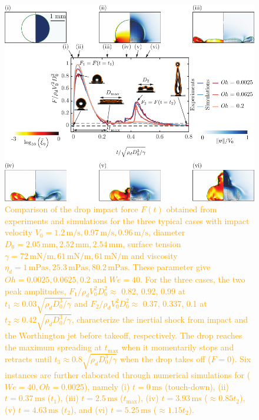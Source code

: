 \documentclass[]{article}
\newcommand{\VS}[1]{{\textcolor{orange}{#1}}}
\begin{document}
\begin{enumerate}
	\begin{figure}
		\centering
		\includegraphics[width=\textwidth]{../Main/Figures/Figure1_summary_v5.pdf}
		\caption{\VS{Comparison of the drop impact force $F(t)$ obtained from experiments and simulations for the three typical cases with impact velocity $V_0 = 1.2\,\si{\meter}/\si{\second}, 0.97\,\si{\meter}/\si{\second}, 0.96\,\si{\meter}/\si{\second}$, diameter $D_0 = 2.05\,\si{\milli\meter}, 2.52\,\si{\milli\meter}, 2.54\,\si{\milli\meter}$, surface tension $\gamma = 72\,\si{\milli\newton}/\si{\meter}, 61\,\si{\milli\newton}/\si{\meter}, 61\,\si{\milli\newton}/\si{\meter}$ and viscosity $\eta_d = 1\,\si{\milli\pascal\second}, 25.3\,\si{\milli\pascal\second}, 80.2\,\si{\milli\pascal\second}$. These parameter give $Oh = 0.0025, 0.0625, 0.2$ and $We = 40$.
			For the three cases, the two peak amplitudes, $F_1/\rho_dV_0^2D_0^2 \approx$ 0.82, 0.92, 0.99 at $t_1 \approx 0.03\sqrt{\rho_dD_0^3/\gamma}$ and $F_2/\rho_dV_0^2D_0^2 \approx$ 0.37, 0.337, 0.1 at $t_2 \approx 0.42\sqrt{\rho_dD_0^3/\gamma}$, characterize the inertial shock from impact and the Worthington jet before takeoff, respectively. 
			The drop reaches the maximum spreading at $t_{\text{max}}$ when it momentarily stops and retracts until $t_3 \approx 0.8\sqrt{\rho_dD_0^3/\gamma}$ when the drop takes off ($F = 0$).
			Six instances are further elaborated through numerical simulations for ($We = 40, Oh = 0.0025$), namely (i) $t = 0\,\si{\milli\second}$ (touch-down), (ii) $t = 0.37\,\si{\milli\second}$ ($t_1$), (iii) $t = 2.5\,\si{\milli\second}$ ($t_{\text{max}}$), (iv) $t = 3.93\,\si{\milli\second}$ ($\approx 0.85t_2$), (v) $t = 4.63\,\si{\milli\second}$ ($t_2$), and (vi) $t = 5.25\,\si{\milli\second}$ ($\approx 1.15t_2$). 
}}
\end{figure}
\end{enumerate}
\end{document}
